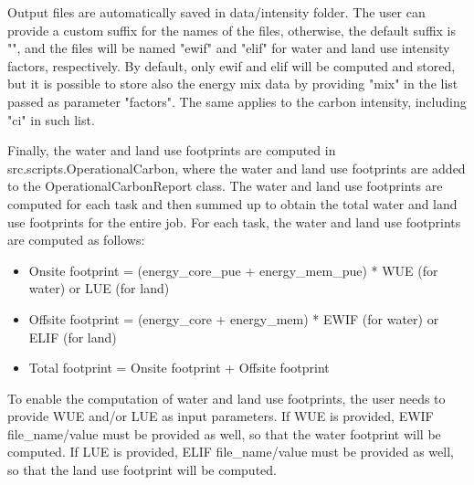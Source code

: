 Output files are automatically saved in data/intensity folder. The user can provide a custom suffix for the names of the files, otherwise, the default suffix is "", and the files will be named "ewif" and "elif" for water and land use intensity factors, respectively. By default, only ewif and elif will be computed and stored, but it is possible to store also the energy mix data by providing "mix" in the list passed as parameter "factors". The same applies to the carbon intensity, including "ci" in such list.

Finally, the water and land use footprints are computed in src.scripts.OperationalCarbon, where the water and land use footprints are added to the OperationalCarbonReport class. The water and land use footprints are computed for each task and then summed up to obtain the total water and land use footprints for the entire job. 
For each task, the water and land use footprints are computed as follows:
\begin{itemize}
    \item Onsite footprint = (energy_core_pue + energy_mem_pue) * WUE (for water) or LUE (for land)
    \item Offsite footprint = (energy_core + energy_mem) * EWIF (for water) or ELIF (for land)
    \item Total footprint = Onsite footprint + Offsite footprint
\end{itemize}

To enable the computation of water and land use footprints, the user needs to provide WUE and/or LUE as input parameters. If WUE is provided, EWIF file_name/value must be provided as well, so that the water footprint will be computed. If LUE is provided, ELIF file_name/value must be provided as well, so that the land use footprint will be computed. 